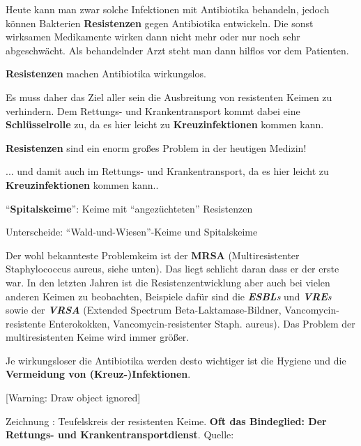 \documentclass{article}
\newcommand\gEs[1]{\textbf{\textcolor[rgb]{0.0,0.0,0.5019608}{#1}}}
\newcommand\gEs[1]{\textbf{\textcolor[rgb]{0.0,0.0,0.5019608}{#1}}}
\newcommand\gT[1]{\textbf{\textup{\textcolor[rgb]{0.0,0.5019608,0.0}{#1}}}}
\newcommand\gZ[1]{\textcolor[rgb]{0.5019608,0.5019608,0.5019608}{#1}}
\newcounter{Drawing}
\renewcommand\theDrawing{\arabic{Drawing}}
\begin{document}
{\mdseries
Heute kann man zwar solche Infektionen mit Antibiotika behandeln, jedoch
k\"onnen Bakterien \gEs{Resistenzen} gegen
Antibiotika entwickeln. Die sonst wirksamen Medikamente wirken dann
nicht mehr oder nur noch sehr abgeschw\"acht. Als behandelnder Arzt
steht man dann hilflos vor dem Patienten. }

{\mdseries
\gT{Resistenzen} machen Antibiotika wirkungslos. }

{\mdseries
Es muss daher das Ziel aller sein die Ausbreitung von resistenten Keimen
zu verhindern. Dem Rettungs- und Krankentransport kommt dabei eine
\gEs{Schl\"usselrolle} zu, da es hier leicht zu
\gEs{Kreuzinfektionen} kommen kann. }

{\mdseries
\gT{Resistenzen} sind ein enorm gro{\ss}es Problem in der
heutigen Medizin!}

{\mdseries
... und damit auch im Rettungs- und Krankentransport, da es hier leicht
zu \gEs{Kreuzinfektionen} kommen kann..}

{\mdseries
{\textquotedblleft}\gT{Spitalskeime}{\textquotedblright}:
Keime mit {\textquotedblleft}angez\"uchteten{\textquotedblright}
Resistenzen}

{\mdseries
Unterscheide:
{\textquotedblleft}Wald-und-Wiesen{\textquotedblright}-Keime und
Spitalskeime }

{\mdseries
Der wohl bekannteste Problemkeim ist der \gT{MRSA}
(Multiresistenter Staphylococcus aureus, siehe unten). Das liegt
schlicht daran dass er der erste war. In den letzten Jahren ist die
Resistenzentwicklung aber auch bei vielen anderen Keimen zu beobachten,
Beispiele daf\"ur sind die
\gT{\textit{ESBL}}\textit{{\textquotesingle}s} und
\gT{\textit{VRE}}\textit{{\textquotesingle}s} sowie der
\gT{\textit{VRSA}} \gZ{(Extended
Spectrum Beta-Laktamase-Bildner, Vancomycin-resistente Enterokokken,
Vancomycin-resistenter Staph. aureus)}. Das Problem der
multiresistenten Keime wird immer gr\"o{\ss}er.}

{\mdseries
Je wirkungsloser die Antibiotika werden desto wichtiger ist die Hygiene
und die \gEs{Vermeidung von (Kreuz-)Infektionen}. }

\begin{minipage}{13.67cm}
[Warning: Draw object ignored]

{\mdseries
Zeichnung \stepcounter{Drawing}{\theDrawing}: Teufelskreis der
resistenten Keime. \gEs{Oft das Bindeglied: Der
Rettungs- und Krankentransportdienst}. Quelle: }

\end{minipage}
\end{document}
